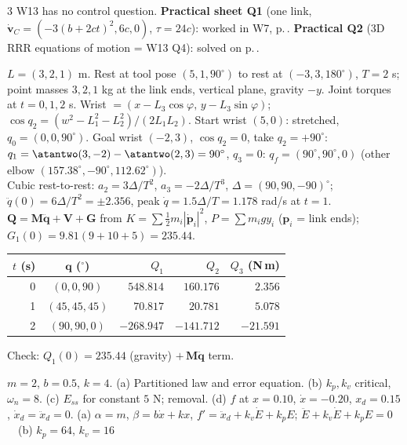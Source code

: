 \begin{multicols}{3}
W13 has no control question. \textbf{Practical sheet Q1} (one link, $\dot{\mathbf v}_C=(-3(b{+}2ct)^2,6c,0)$, $\tau=24c$): worked in W7, p.\,\pageref{p:W7}. \textbf{Practical Q2} (3D RRR equations of motion = W13 Q4): solved on p.\,\pageref{p:SAMPLE}.
\begin{examq}
$L=(3,2,1)$ m. Rest at tool pose $(5,1,90^\circ)$ to rest at $(-3,3,180^\circ)$, $T=2$ s; point masses $3,2,1$ kg at the link ends, vertical plane, gravity $-y$. Joint torques at $t=0,1,2$ s.
\solution
Wrist $=(x-L_3\cos\varphi,\,y-L_3\sin\varphi)$; $\cos q_2=(w^2-L_1^2-L_2^2)/(2L_1L_2)$. Start wrist $(5,0)$: stretched, $q_0=(0,0,90^\circ)$. Goal wrist $(-2,3)$, $\cos q_2=0$, take $q_2=+90^\circ$: $q_1=\atantwo(3,-2)-\atantwo(2,3)=90^\circ$, $q_3=0$: $q_f=(90^\circ,90^\circ,0)$ (other elbow $(157.38^\circ,-90^\circ,112.62^\circ)$).\\
Cubic rest-to-rest: $a_2=3\Delta/T^2$, $a_3=-2\Delta/T^3$, $\Delta=(90,90,-90)^\circ$; $\ddot q(0)=6\Delta/T^2=\pm2.356$, peak $\dot q=1.5\Delta/T=1.178$ rad/s at $t=1$.\\
$\mathbf Q=\mathbf M\ddot{\mathbf q}+\mathbf V+\mathbf G$ from $K=\sum\frac12m_i|\dot{\mathbf p}_i|^2$, $P=\sum m_igy_i$ ($\mathbf p_i$ = link ends); $G_1(0)=9.81(9+10+5)=235.44$.
\begin{center}\scriptsize
\begin{tabular}{@{}rcrrr@{}}\toprule
$t$ (s) & $\mathbf q$ ($^\circ$) & $Q_1$ & $Q_2$ & $Q_3$ (N\,m)\\\midrule
0 & $(0,0,90)$ & $548.814$ & $160.176$ & $2.356$\\
1 & $(45,45,45)$ & $70.817$ & $20.781$ & $5.078$\\
2 & $(90,90,0)$ & $-268.947$ & $-141.712$ & $-21.591$\\\bottomrule
\end{tabular}
\end{center}
Check: $Q_1(0)=235.44$ (gravity) $+\,\mathbf M\ddot{\mathbf q}$ term. \chk
\end{examq}
\begin{examq}
$m{=}2$, $b{=}0.5$, $k{=}4$. (a) Partitioned law and error equation. (b) $k_p,k_v$ critical, $\omega_n{=}8$. (c) $E_{ss}$ for constant $5$ N; removal. (d) $f$ at $x{=}0.10$, $\dot x{=}-0.20$, $x_d{=}0.15$, $\dot x_d{=}\ddot x_d{=}0$.
\solution
(a) $\alpha=m$, $\beta=b\dot x+kx$, $f'=\ddot x_d+k_v\dot E+k_pE$; $\ddot E+k_v\dot E+k_pE=0$ \ \ (b) $k_p=64$, $k_v=16$ \\

\end{examq}
\end{multicols}
